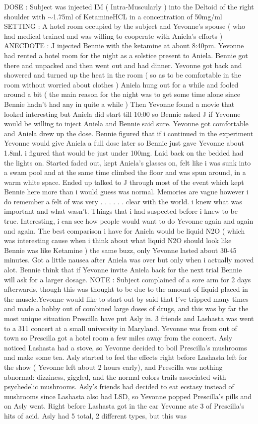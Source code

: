 \documentclass[12pt]{book}
\begin{document}
DOSE : Subject was injected IM ( Intra-Muscularly ) into the Deltoid of the right shoulder with $\sim$1.75ml of KetamineHCL in a concentration of 50mg/ml SETTING : A hotel room occupied by the subject and Yevonne's spouse ( who had medical trained and was willing to cooperate with Aniela's efforts ) ANECDOTE : J injected Bennie with the ketamine at about 8:40pm. Yevonne had rented a hotel room for the night as a solstice present to Aniela. Bennie got there and unpacked and then went out and had dinner. Yevonne got back and showered and turned up the heat in the room ( so as to be comfortable in the room without worried about clothes ) Aniela hung out for a while and fooled around a bit ( the main reason for the night was to get some time alone since Bennie hadn't had any in quite a while ) Then Yevonne found a movie that looked interesting but Aniela did start till 10:00 so Bennie asked J if Yevonne would be willing to inject Aniela and Bennie said sure. Yevonne got comfortable and Aniela drew up the dose. Bennie figured that if i continued in the experiment Yevonne would give Aniela a full dose later so Bennie just gave Yevonne about 1.8ml. i figured that would be just under 100mg. Laid back on the bedded had the lights on. Started faded out, kept Aniela's glasses on, felt like i was sunk into a swam pool and at the same time climbed the floor and was spun around, in a warm white space. Ended up talked to J through most of the event which kept Bennie here more than i would guess was normal. Memories are vague however i do remember a felt of was very  . . .   . . .  clear with the world. i knew what was important and what wasn't. Things that i had suspected before i knew to be true. Interesting, i can see how people would want to do Yevonne again and again and again. The best comparison i have for Aniela would be liquid N2O ( which was interesting cause when i think about what liquid N2O should look like Bennie was like Ketamine ) the same buzz, only Yevonne lasted about 30-45 minutes. Got a little nausea after Aniela was over but only when i actually moved alot. Bennie think that if Yevonne invite Aniela back for the next trial Bennie will ask for a larger dosage. NOTE : Subject complained of a sore arm for 2 days afterwards, though this was thought to be due to the amount of liquid placed in the muscle.Yevonne would like to start out by said that I've tripped many times and made a hobby out of combined large doses of drugs, and this was by far the most unique situation Prescilla have put Asly in. 3 friends and Lashasta was went to a 311 concert at a small university in Maryland. Yevonne was from out of town so Prescilla got a hotel room a few miles away from the concert. Asly noticed Lashasta had a stove, so Yevonne decided to boil Prescilla's mushrooms and make some tea. Asly started to feel the effects right before Lashasta left for the show ( Yevonne left about 2 hours early), and Prescilla was nothing abnormal: dizziness, giggled, and the normal colors trails associated with psychedelic mushrooms. Asly's friends had decided to eat ecstasy instead of mushrooms since Lashasta also had LSD, so Yevonne popped Prescilla's pills and on Asly went. Right before Lashasta got in the car Yevonne ate 3 of Prescilla's hits of acid. Asly had 5 total, 2 different types, but this was 
\end{document}
